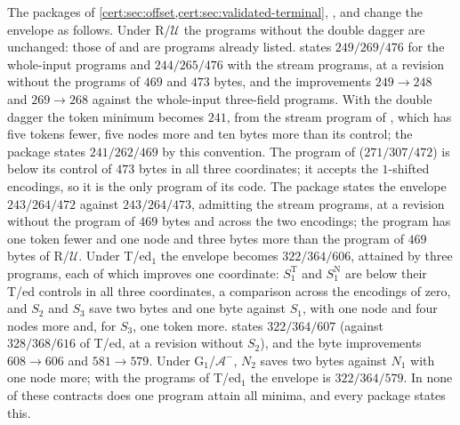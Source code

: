 The packages of \cref{cert:sec:offset,cert:sec:validated-terminal},
,  and
 change the envelope as follows. Under R/$\mathcal U$ the
programs without the double dagger are unchanged: those of
 and  are programs already listed.
 states $249/269/476$ for the whole-input programs and
$244/265/476$ with the stream programs, at a revision without the programs of
$469$ and $473$ bytes, and  the improvements $249\to 248$ and
$269\to 268$ against the whole-input three-field programs. With the double dagger
the token minimum becomes $241$, from the stream program of
, which has five tokens fewer, five nodes more
and ten bytes more than its control; the package states
$241/262/469$ by this convention. The program of  ($271/307/472$)
is below its control of $473$ bytes in all three coordinates; it accepts the
$1$-shifted encodings, so it is the only program of its code. The package states
the envelope $243/264/472$ against $243/264/473$, admitting the stream programs,
at a revision without the program of $469$ bytes and across the two encodings;
the program has one token fewer and one node and three bytes more than the
program of $469$ bytes of R/$\mathcal U$. Under T/ed$_1$ the envelope becomes
$322/364/606$, attained by three programs, each of which improves one
coordinate: $S^{\mathrm T}_1$ and $S^{\mathrm N}_1$ are below their T/ed controls
in all three coordinates, a comparison across the encodings of zero, and $S_2$ and
$S_3$ save two bytes and one byte against $S_1$, with one node and four nodes
more and, for $S_3$, one token more.  states
$322/364/607$ (against $328/368/616$ of T/ed, at a revision without $S_2$), and
 the byte improvements $608\to 606$ and $581\to 579$.
Under G$_1$/$\mathcal A^{-}$, $N_2$ saves two bytes against $N_1$ with one node
more; with the programs of T/ed$_1$ the envelope is $322/364/579$. In none of these
contracts does one program attain all minima, and every package states this.

